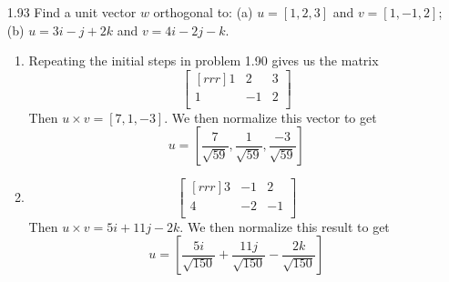 \documentclass[12pt]{article}
\theoremstyle{plain}
\theoremstyle{definition}
\theoremstyle{plain}
\begin{document}
\begin{enumerate}
\item[1.93]Find a unit vector $w$ orthogonal to: (a) $u=[1,2,3]$ and $v=[1,-1,2]$; (b) $u=3i-j+2k$ and $v=4i-2j-k$.
	\begin{enumerate}
	\item Repeating the initial steps in problem 1.90 gives us the matrix
		\[ \begin{bmatrix}[rrr]1&2&3\\1&-1&2\\\end{bmatrix} \]
		Then $u \times v = [7,1,-3]$. We then normalize this vector to get
		\[ u = \left[ \dfrac{7}{\sqrt{59}},\dfrac{1}{\sqrt{59}},\dfrac{-3}{\sqrt{59}} \right] \]
	\item 
		\[ \begin{bmatrix}[rrr]3&-1&2\\4&-2&-1\\\end{bmatrix} \]
		Then $u\times v = 5i+11j-2k$. We then normalize this result to get
		\[ u = \left[ \dfrac{5i}{\sqrt{150}}+\dfrac{11j}{\sqrt{150}}-\dfrac{2k}{\sqrt{150}} \right] \]
	\end{enumerate}
		

\end{enumerate}
\end{document}

